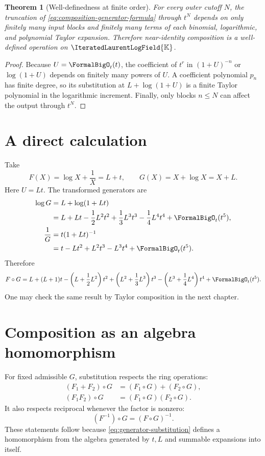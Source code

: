 \documentclass[11pt,oneside]{book}
\newtheorem{theorem}{Theorem}[chapter]
\theoremstyle{definition}
\theoremstyle{remark}
\newcommand{\K}{\mathbb K}
\newcommand{\PLfield}{\IteratedLaurentLogField{\K}}
\newcommand{\compose}{\mathbin{\circ}}
\begin{document}
\begin{theorem}[Well-definedness at finite order]\label{thm:composition-well-defined}
For every outer cutoff $N$, the truncation of \eqref{eq:composition-generator-formula}
through $t^N$ depends on only finitely many input blocks and finitely many
terms of each binomial, logarithmic, and polynomial Taylor expansion.
Therefore near-identity composition is a well-defined operation on
$\PLfield$.
\end{theorem}
\begin{proof}
Because $U=\FormalBigO_t(t)$, the coefficient of $t^r$ in $(1+U)^{-n}$ or
$\log(1+U)$ depends on finitely many powers of $U$.  A coefficient polynomial
$p_n$ has finite degree, so its substitution at
$L+\log(1+U)$ is a finite Taylor polynomial in the logarithmic increment.
Finally, only blocks $n\le N$ can affect the output through $t^N$.
\end{proof}

\section{A direct calculation}
Take
\[
 F(X)=\log X+\frac1X=L+t,
 \qquad
 G(X)=X+\log X=X+L.
\]
Here $U=Lt$.  The transformed generators are
\begin{align*}
 \log G
 &=L+\log(1+Lt)\\
 &=L+Lt-\frac12L^2t^2+\frac13L^3t^3
   -\frac14L^4t^4+\FormalBigO_t(t^5),\\
 \frac1G
 &=t(1+Lt)^{-1}\\
 &=t-Lt^2+L^2t^3-L^3t^4+\FormalBigO_t(t^5).
\end{align*}
Therefore
\begin{equation}\label{eq:composition-example}
 F\compose G
 =L+(L+1)t-\left(L+\frac12L^2\right)t^2
 +\left(L^2+\frac13L^3\right)t^3
 -\left(L^3+\frac14L^4\right)t^4
 +\FormalBigO_t(t^5).
\end{equation}
One may check the same result by Taylor composition in the next chapter.

\section{Composition as an algebra homomorphism}
For fixed admissible $G$, substitution respects the ring operations:
\begin{align}\label{eq:composition-homomorphism}
 (F_1+F_2)\compose G&=(F_1\compose G)+(F_2\compose G),\\
 (F_1F_2)\compose G&=(F_1\compose G)(F_2\compose G).
\end{align}
It also respects reciprocal whenever the factor is nonzero:
\[
 (F^{-1})\compose G=(F\compose G)^{-1}.
\]
These statements follow because \eqref{eq:generator-substitution} defines a
homomorphism from the algebra generated by $t,L$ and summable expansions into
itself.
\end{document}
